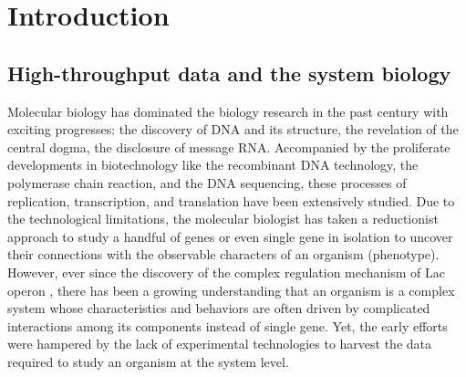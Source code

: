 \chapter{Introduction}\label{ch:introduction}


\instructionsintroduction



\section{High-throughput data and the system biology}


Molecular biology has dominated the biology research in the past
century with exciting progresses: the discovery of DNA and its
structure, the revelation of the central dogma, the disclosure of
message RNA.
%
%
Accompanied by the proliferate developments in biotechnology like the
recombinant DNA technology, the polymerase chain reaction, and the DNA
sequencing, these processes of replication, transcription, and
translation have been extensively studied.
%
Due to the technological limitations, the molecular biologist has
taken a reductionist approach to study a handful of genes or even
single gene in isolation to uncover their connections with the
observable characters of an organism (phenotype).
%
However, ever since the discovery of the complex regulation mechanism
of Lac operon \cite{Jacob1961}, there has been a growing understanding
that an organism is a complex system whose characteristics and behaviors are
often driven by complicated interactions among its components instead
of single gene.  
%
%
Yet, the early efforts were hampered by the lack of experimental
technologies to harvest the data required to study an organism at the
system level.


